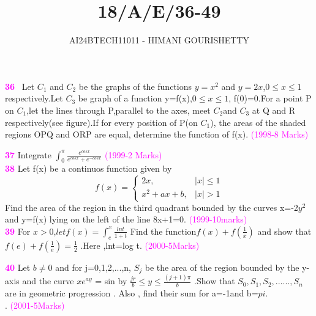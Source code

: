 \documentclass[journal,12pt,twocolumn]{IEEEtran}
\theoremstyle{remark}
\begin{document}

\vspace{3cm}

\title{18/A/E/36-49}
\author{AI24BTECH11011 - HIMANI GOURISHETTY}
\maketitle
\newpage
\bigskip

\renewcommand{\thefigure}{\theenumi}
\renewcommand{\thetable}{\theenumi}


\textbf{\textcolor{magenta}{36}}
\ Let $C_1$ and $C_2$ be the graphs of the functions $y=x^2$ and $y=2x$,$0\le x\le1$ respectively.Let $C_3$ be graph of a function y=f(x),$0\le x \le 1$, f(0)=0.For a point P on $C_1$,let the lines through P,parallel to the axes, meet $C_2$and $C_3$ at Q and R respectively(see figure).If for every position of P(on $C_1$), the areas of the shaded regions OPQ and ORP are equal, determine the function of f(x).
    \hfill{\textcolor{magenta}{(1998-8 Marks)}}

				        
					\textbf{\textcolor{magenta}{37}}
					   Integrate $\int_{0}^{\pi}\frac{e^{cosx}}{e^{cosx}+e^{-cosx}}$
					            \hfill{\textcolor{magenta}{(1999-2 Marks)}}\\
						             
							      \textbf{\textcolor{magenta}{38}}
							        Let f(x) be a continuos function given by \\
								     \[
								          f(x)=
									       \begin{cases}
									                2x,&|x|\le1\\
											         x^2+ax+b,&|x|>1
												      \end{cases}
												           \]
													    Find the area of the region in the third quadrant bounded by the curves x=-2$y^2$ and y=f(x) lying on the left of the line 8x+1=0.  
													        \hfill{\textcolor{magenta}{(1999-10marks)}}\\
														    
														    \textbf{\textcolor{magenta}{39}}
														    For $x > 0 $,$
														    let f(x)=\int_{e}^{x}\frac{lnt}{1+t}$
														    Find the function$ f(x) + f(\frac{1}{x})$
														    and show that $f(e)+f(\frac{1}{e})=
														    \frac{1}{2}$ .Here ,lnt=log t.
														      \hfill{\textcolor{magenta}{(2000-5Marks)}}
														        

															  \textbf{\textcolor{magenta}{40}}
															    Let $b\neq0$ and for j=0,1,2,...,n, $S_j$ be the area of the region bounded by the y-axis and the curve $xe^{ay}$ = sin by $\frac{jr}{b} \le y \le \frac{(j+1)\pi}{b}$ .Show that  $S_0,S_1,S_2,......,S_n$ are in geometric progression . Also , find their sum for a=-1and b=$pi$.\\.
															      \hfill{\textcolor{magenta}{(2001-5Marks)}}
															        
\end{document}
